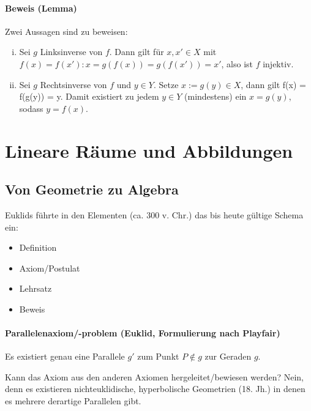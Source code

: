 \documentclass[12pt,a4paper,parskip=half-,DIV=15]{scrartcl}
\begin{document}
\paragraph{Beweis (Lemma)} Zwei Aussagen sind zu beweisen:
\begin{enumerate}[i)]
\item Sei $ g $ Linksinverse von $ f $. Dann gilt für $ x,x'\in X $ mit \\$ f(x) = f(x'): x = g(f(x)) = g(f(x')) = x' $, also ist $ f $ injektiv.
\item Sei $g $ Rechtsinverse von $ f $ und $ y\in Y $. Setze $ x:= g(y)\in X $, dann gilt f(x) = f(g(y)) = y. Damit existiert zu jedem $ y\in Y $ (mindestens) ein $ x = g(y) $, sodass  $ y=f(x) $.
\end{enumerate}


\section{Lineare Räume und Abbildungen}
\subsection{Von Geometrie zu Algebra}
Euklids führte in den \glqq Elementen\grqq{} (ca. 300 v. Chr.) das bis heute gültige Schema ein:
\begin{itemize}
\item Definition\item Axiom/Postulat\item Lehrsatz\item Beweis
\end{itemize}

\paragraph{Parallelenaxiom/-problem (Euklid, Formulierung nach Playfair)} Es existiert genau eine Parallele $ g' $ zum Punkt $ P \notin g $ zur Geraden $ g $.


Kann das Axiom aus den anderen Axiomen hergeleitet/bewiesen werden? Nein, denn es existieren nichteuklidische, hyperbolische Geometrien (18. Jh.) in denen es mehrere derartige Parallelen gibt.
\end{document}
